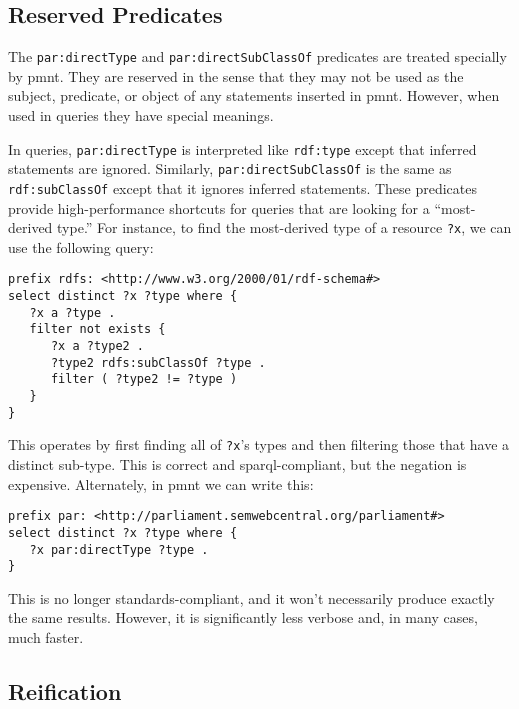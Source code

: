 \subsection{Reserved Predicates}
\label{section-reserved-predicates}

The \verb|par:directType| and \verb|par:directSubClassOf| predicates are treated specially by \ac{pmnt}.  They are reserved in the sense that they may not be used as the subject, predicate, or object of any  statements inserted in \ac{pmnt}.  However, when used in queries they have special meanings.

In queries, \verb|par:directType| is interpreted like \verb|rdf:type| except that inferred statements are ignored.  Similarly, \verb|par:directSubClassOf| is the same as \verb|rdf:subClassOf| except that it ignores inferred statements.  These predicates provide high-performance shortcuts for queries that are looking for a ``most-derived type.''  For instance, to find the most-derived type of a resource \verb|?x|, we can use the following query:

{\small\begin{verbatim}
prefix rdfs: <http://www.w3.org/2000/01/rdf-schema#>
select distinct ?x ?type where {
   ?x a ?type .
   filter not exists {
      ?x a ?type2 .
      ?type2 rdfs:subClassOf ?type .
      filter ( ?type2 != ?type )
   }
}
\end{verbatim}}

This operates by first finding all of \verb|?x|'s types and then filtering those that have a distinct sub-type.  This is correct and \ac{sparql}-compliant, but the negation is expensive.  Alternately, in \ac{pmnt} we can write this:

{\small\begin{verbatim}
prefix par: <http://parliament.semwebcentral.org/parliament#>
select distinct ?x ?type where {
   ?x par:directType ?type .
}
\end{verbatim}}

This is no longer standards-compliant, and it won't necessarily produce exactly the same results.  However, it is significantly less verbose and, in many cases, much faster.

\subsection{Reification}
\label{section-reification}

